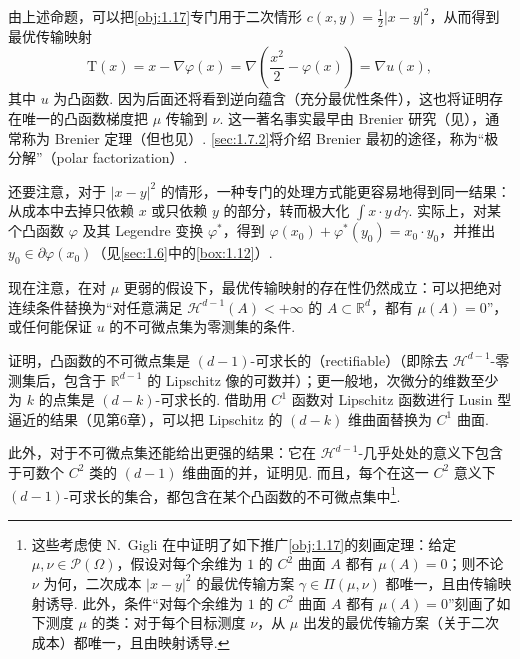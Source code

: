 由上述命题，可以把\autoref{obj:1.17}专门用于二次情形 $c(x,y)=\frac12|x-y|^2$，从而得到最优传输映射
\[
\mathrm{T}(x)=x-\nabla\varphi(x)=\nabla\left(\frac{x^2}{2}-\varphi(x)\right)=\nabla u(x),
\]
其中 $u$ 为凸函数. 因为后面还将看到逆向蕴含（充分最优性条件），这也将证明存在唯一的凸函数梯度把 $\mu$ 传输到 $\nu$. \label{idx:i58-p17}
这一著名事实最早由 Brenier 研究（见\cite{b82}），通常称为 Brenier 定理（但也见\cite{b227}）. \autoref{sec:1.7.2}将介绍 Brenier 最初的途径，称为“极分解”（polar factorization）.

\label{idx:i83-p17}
还要注意，对于 $|x-y|^2$ 的情形，一种专门的处理方式能更容易地得到同一结果：从成本中去掉只依赖 $x$ 或只依赖 $y$ 的部分，转而极大化 $\int x\cdot y\,d\gamma$. 实际上，对某个凸函数 $\varphi$ 及其 Legendre 变换 $\varphi^*$，得到 $\varphi(x_0)+\varphi^*(y_0)=x_0\cdot y_0$，并推出 $y_0\in\partial\varphi(x_0)$（见\autoref{sec:1.6}中的\autoref{box:1.12}）.

现在注意，在对 $\mu$ 更弱的假设下，最优传输映射的存在性仍然成立：可以把绝对连续条件替换为“对任意满足 $\mathscr H^{d-1}(A)<+\infty$ 的 $A\subset\mathbb R^d$，都有 $\mu(A)=0$”，或任何能保证 $u$ 的不可微点集为零测集的条件.

\label{idx:i129-p17}
\cite{b4,b5}证明，凸函数的不可微点集是 $(d-1)$-可求长的（rectifiable）（即除去 $\mathscr H^{d-1}$-零测集后，包含于 $\mathbb R^{d-1}$ 的 Lipschitz 像的可数并）；更一般地，次微分的维数至少为 $k$ 的点集是 $(d-k)$-可求长的. 借助用 $C^1$ 函数对 Lipschitz 函数进行 Lusin 型逼近的结果（见\cite{b160}第6章），可以把 Lipschitz 的 $(d-k)$ 维曲面替换为 $C^1$ 曲面.

此外，对于不可微点集还能给出更强的结果：它在 $\mathscr H^{d-1}$-几乎处处的意义下包含于可数个 $C^2$ 类的 $(d-1)$ 维曲面的并，证明见\cite{b3}. 而且，每个在这一 $C^2$ 意义下 $(d-1)$-可求长的集合，都包含在某个凸函数的不可微点集中\footnote{这些考虑使 N.~Gigli 在\cite{b182}中证明了如下推广\autoref{obj:1.17}的刻画定理：给定 $\mu,\nu\in\mathscr P(\Omega)$，假设对每个余维为 $1$ 的 $C^2$ 曲面 $A$ 都有 $\mu(A)=0$；则不论 $\nu$ 为何，二次成本 $|x-y|^2$ 的最优传输方案 $\gamma\in\Pi(\mu,\nu)$ 都唯一，且由传输映射诱导. 此外，条件“对每个余维为 $1$ 的 $C^2$ 曲面 $A$ 都有 $\mu(A)=0$”刻画了如下测度 $\mu$ 的类：对于每个目标测度 $\nu$，从 $\mu$ 出发的最优传输方案（关于二次成本）都唯一，且由映射诱导.}.

